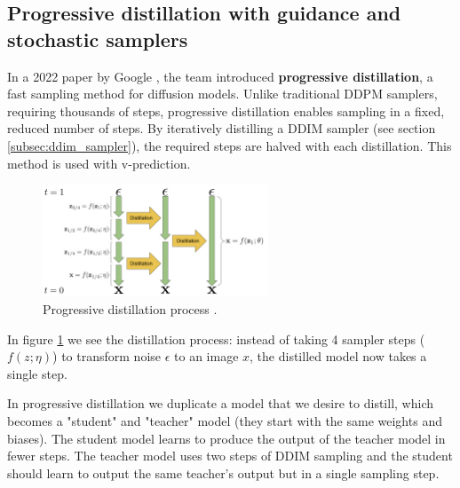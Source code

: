 \subsection{Progressive distillation with guidance and stochastic samplers}

In a 2022 paper by Google \cite{v_prediction}, the team introduced \textbf{progressive distillation}, a fast sampling method for diffusion models. Unlike traditional DDPM samplers, requiring thousands of steps, progressive distillation enables sampling in a fixed, reduced number of steps. By iteratively distilling a DDIM sampler (see section \ref{subsec:ddim_sampler}), the required steps are halved with each distillation. This method is used with v-prediction.

\begin{figure}
    \centering
    \includegraphics[width=0.6\textwidth]{images/imagen_video/v_prediction.png}
    \caption{Progressive distillation process \cite{v_prediction}.}
    \label{fig:progressive_distillation}
\end{figure}

In figure \ref{fig:progressive_distillation} we see the distillation process: instead of taking 4 sampler steps ($f(z; \eta)$) to transform noise $\epsilon$ to an image $x$, the distilled model now takes a single step.

In progressive distillation we duplicate a model that we desire to distill, which becomes a "student" and "teacher" model (they start with the same weights and biases). The student model learns to produce the output of the teacher model in fewer steps. The teacher model uses two steps of DDIM sampling and the student should learn to output the same teacher's output but in a single sampling step.



